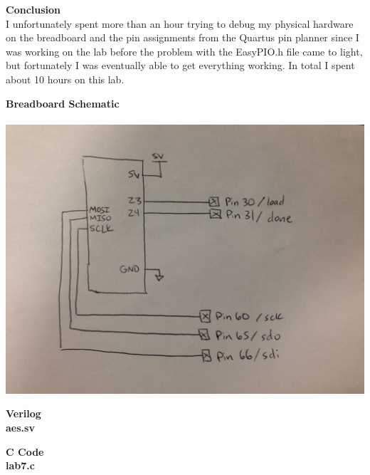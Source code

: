 \documentclass[11pt,letterpaper]{article}
\begin{document}
\noindent\textbf{Conclusion}\\
I unfortunately spent more than an hour trying to debug my physical hardware on the breadboard and the pin assignments from the Quartus pin planner since I was working on the lab before the problem with the EasyPIO.h file came to light, but fortunately I was eventually able to get everything working. In total I spent about 10 hours on this lab.


\pagebreak

\noindent\textbf{Breadboard Schematic}\\\\
\includegraphics[scale=0.15]{lab7schematic}


\noindent\textbf{Verilog}\\
\lstset{language=Verilog}
\noindent\textbf{aes.sv}


\noindent\textbf{C Code}\\
\lstset{language=C}
\noindent\textbf{lab7.c}

\end{document}
